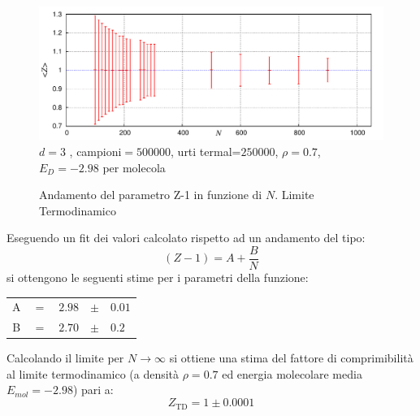 \begin{figure}[htbp]
\centering
	\caption[Sfere Soffici$/$Problema12.cpp $\quad \rightarrow \quad$ ZvsN\_file.p]{Andamento del parametro Z-1 in funzione di $N$. Limite Termodinamico }\vspace{-15pt}
	\includegraphics[scale=0.95]{Immagini/Soffici/ZvsN3D}
	\newline\footnotesize{ $d=3$ , campioni$= 500000$,  urti termal=$ 250000$, $\rho = 0.7$,	$E_D=-2.98$ per molecola}
	\label{fig: Limite Termo}
\end{figure}

Eseguendo un fit dei valori calcolato rispetto ad un andamento del tipo:
\begin{equation}\label{eq: limiteTermo}
 (Z-1) = A + \dfrac{B}{N}
\end{equation}
si ottengono le seguenti stime per i parametri della funzione:
\begin{center}
\begin{tabular}{|c c r c l |}
\hline
	A	 & $=$ & $ 2.98 $ & $\pm$ & $0.01 $	\\
	B	 & $=$ & $ 2.70$ & $\pm$ & $0.2 $	\\
\hline
\end{tabular}
\end{center}

Calcolando il limite per $N\rightarrow \infty$ si ottiene una stima del fattore di comprimibilità al limite termodinamico (a densità $\rho=0.7$ ed energia molecolare media $E_{mol} = -2.98$) pari a: 
\begin{displaymath}
Z_{\textrm{TD}} = 1 \pm 0.0001
\end{displaymath}

